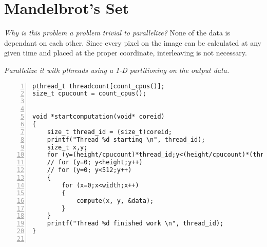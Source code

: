 \documentclass{article}
\begin{document}
\section{Mandelbrot's Set}

\begin{ExerciseList}
\Exercise
{}

\Question \emph{Why is this problem a problem trivial to parallelize?}
\Answer None of the data is dependant on each other. Since every pixel on the image can be calculated at any given time and placed at the proper coordinate, interleaving is not necessary.

\Question \emph{Parallelize it with pthreads using a 1-D partitioning on
the output data.}

\begin{lstlisting}[basicstyle=\small\sffamily,
keywords={break,case,const,continue,default,else,enum,
for,if,return,switch,while,do,long,void,int,float,double,
char,struct,typedef,include,size\_t},
keywordstyle={\color{blue}},
comment={[l]{//}}, morecomment={[s]{/*}{*/}}, commentstyle=\itshape,
columns={[l]flexible}, numbers=left, numberstyle=\tiny,
frameround=fftt, frame=shadowbox, captionpos=b,
caption={Parallelized computation of Mandelbrot's set.},
label=LST:mandelbrot1]
pthread_t threadcount[count_cpus()];
size_t cpucount = count_cpus();


void *startcomputation(void* coreid)
{
    size_t thread_id = (size_t)coreid;
	printf("Thread %d starting \n", thread_id);
    size_t x,y;
	for (y=(height/cpucount)*thread_id;y<(height/cpucount)*(thread_id +1); y++)
	// for (y=0; y<height;y++)
	// for (y=0; y<512;y++)
	{
		for (x=0;x<width;x++)
		{
			compute(x, y, &data);
		}
	}
	printf("Thread %d finished work \n", thread_id);
}


\end{lstlisting}
\end{ExerciseList}
\end{document}
